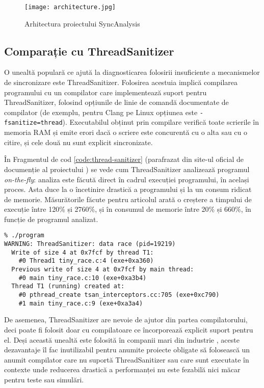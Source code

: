 \begin{figure}[ht]
\centering
\texttt{[image: architecture.jpg]}
\caption{Arhitectura proiectului SyncAnalysis}
\label{fig:architecture}
\end{figure}

\subsection{Comparație cu ThreadSanitizer}
O unealtă populară ce ajută la diagnosticarea folosirii insuficiente a
mecanismelor de sincronizare este ThreadSanitizer\cite{ThreadSanitizer}.
Folosirea acestuia implică compilarea programului cu un compilator care
implementează suport pentru ThreadSanitizer, folosind opțiunile de linie
de comandă documentate de compilator (de exemplu, pentru Clang pe Linux
opțiunea este \lstinline{-fsanitize=thread}). Executabilul obținut prin
compilare verifică toate scrierile în memoria RAM și emite erori dacă
o scriere este concurentă cu o alta sau cu o citire, și cele două nu
sunt explicit sincronizate.

În Fragmentul de cod \ref{code:thread-sanitizer} (parafrazat din site-ul
oficial de documenție al proiectului \cite{ThreadSanitizerDoc}) se vede
cum ThreadSanitizer analizează programul \textit{on-the-fly}: analiza
este făcută direct în cadrul execuției programului, în același proces.
Asta duce la o încetinire drastică a programului și la un consum ridicat
de memorie. Măsurătorile făcute pentru articolul \cite{ThreadSanitizer}
arată o creștere a timpului de execuție între 120\% și 2760\%, și în
consumul de memorie între 20\% și 660\%, în funcție de programul
analizat.

\begin{lstlisting}[caption=Exemplu de folosire ThreadSanitizer,
                   label=code:thread-sanitizer]
% clang -fsanitize=thread -g -O1 -o program tiny_race.c
% ./program
WARNING: ThreadSanitizer: data race (pid=19219)
  Write of size 4 at 0x7fcf by thread T1:
    #0 Thread1 tiny_race.c:4 (exe+0xa360)
  Previous write of size 4 at 0x7fcf by main thread:
    #0 main tiny_race.c:10 (exe+0xa3b4)
  Thread T1 (running) created at:
    #0 pthread_create tsan_interceptors.cc:705 (exe+0xc790)
    #1 main tiny_race.c:9 (exe+0xa3a4)
\end{lstlisting}

De asemenea, ThreadSanitizer are nevoie de ajutor din partea
compilatorului, deci poate fi folosit doar cu compilatoare ce
încorporează explicit suport pentru el. Deși această unealtă este
folosită în companii mari din industrie \cite{ThreadSanitizer}, aceste
dezavantaje îl fac inutilizabil pentru anumite proiecte obligate să
folosească un anumit compilator care nu suportă ThreadSanitizer sau
care sunt executate în contexte unde reducerea drastică a performanței
nu este fezabilă nici măcar pentru teste sau simulări.

